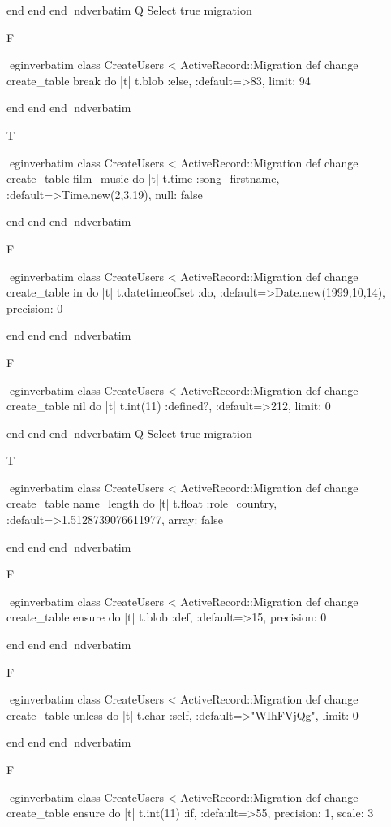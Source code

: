     end 
  end 
end
nd{verbatim}
Q
 Select true migration

F

egin{verbatim}
 class CreateUsers < ActiveRecord::Migration 
  def change 
    create_table break do |t| 
      t.blob :else, :default=>83, limit: 94
    
    end 
  end 
end
nd{verbatim}

T

egin{verbatim}
 class CreateUsers < ActiveRecord::Migration 
  def change 
    create_table film_music do |t| 
      t.time :song_firstname, :default=>Time.new(2,3,19), null: false
    
    end 
  end 
end
nd{verbatim}

F

egin{verbatim}
 class CreateUsers < ActiveRecord::Migration 
  def change 
    create_table in do |t| 
      t.datetimeoffset :do, :default=>Date.new(1999,10,14), precision: 0
    
    end 
  end 
end
nd{verbatim}

F

egin{verbatim}
 class CreateUsers < ActiveRecord::Migration 
  def change 
    create_table nil do |t| 
      t.int(11) :defined?, :default=>212, limit: 0
    
    end 
  end 
end
nd{verbatim}
Q
 Select true migration

T

egin{verbatim}
 class CreateUsers < ActiveRecord::Migration 
  def change 
    create_table name_length do |t| 
      t.float :role_country, :default=>1.5128739076611977, array: false
    
    end 
  end 
end
nd{verbatim}

F

egin{verbatim}
 class CreateUsers < ActiveRecord::Migration 
  def change 
    create_table ensure do |t| 
      t.blob :def, :default=>15, precision: 0
    
    end 
  end 
end
nd{verbatim}

F

egin{verbatim}
 class CreateUsers < ActiveRecord::Migration 
  def change 
    create_table unless do |t| 
      t.char :self, :default=>"WIhFVjQg", limit: 0
    
    end 
  end 
end
nd{verbatim}

F

egin{verbatim}
 class CreateUsers < ActiveRecord::Migration 
  def change 
    create_table ensure do |t| 
      t.int(11) :if, :default=>55, precision: 1, scale: 3
    
